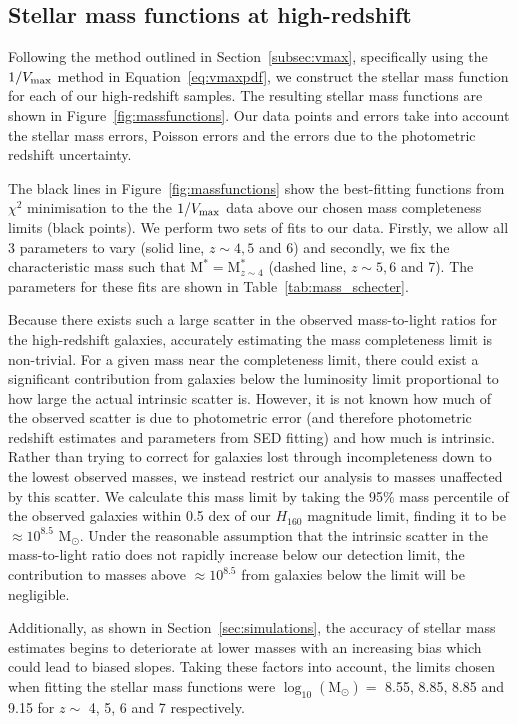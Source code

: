 \subsection{Stellar mass functions at high-redshift}\label{sec:smf}
Following the method outlined in Section~\ref{subsec:vmax}, specifically using the $1/V_{\rm{max}}$ method in Equation~\ref{eq:vmaxpdf}, we construct the stellar mass function for each of our high-redshift samples. The resulting stellar mass functions are shown in Figure~\ref{fig:massfunctions}. Our data points and errors take into account the stellar mass errors, Poisson errors and the errors due to the photometric redshift uncertainty.

The black lines in Figure~\ref{fig:massfunctions} show the best-fitting \citet{Schechter:1976gl} functions from $\chi^2$ minimisation to the the $1/V_{\rm{max}}$ data above our chosen mass completeness limits (black points). We perform two sets of fits to our data. Firstly, we allow all 3 parameters to vary (solid line, $z\sim 4, 5$ and 6) and secondly, we fix the characteristic mass such that $\text{M}^{*} = \text{M}_{z\sim4}^{*}$ (dashed line, $z\sim 5, 6$ and 7). The parameters for these fits are shown in Table~\ref{tab:mass_schecter}. 

Because there exists such a large scatter in the observed mass-to-light ratios for the high-redshift galaxies, accurately estimating the mass completeness limit is non-trivial. For a given mass near the completeness limit, there could exist a significant contribution from galaxies below the luminosity limit proportional to how large the actual intrinsic scatter is. However, it is not known how much of the observed scatter is due to photometric error (and therefore photometric redshift estimates and parameters from SED fitting) and how much is intrinsic.
Rather than trying to correct for galaxies lost through incompleteness down to the lowest observed masses, we instead restrict our analysis to masses unaffected by this scatter. We calculate this mass limit by taking the 95\% mass percentile of the observed galaxies within 0.5 dex of our $H_{160}$ magnitude limit, finding it to be $\approx 10^{8.5}$ M$_{\odot}$. Under the reasonable assumption that the intrinsic scatter in the mass-to-light ratio does not rapidly increase below our detection limit, the contribution to masses above $\approx 10^{8.5}$ from galaxies below the limit will be negligible.

Additionally, as shown in Section~\ref{sec:simulations}, the accuracy of stellar mass estimates begins to deteriorate at lower masses with an increasing bias which could lead to biased slopes. Taking these factors into account, the limits chosen when fitting the stellar mass functions were $\log_{10} (\text{M}_{\odot}) =$ 8.55, 8.85, 8.85 and 9.15 for $z \sim$ 4, 5, 6 and 7 respectively.

